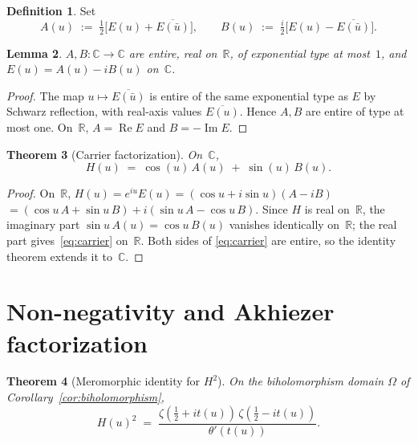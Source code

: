 \documentclass[11pt,a4paper]{article}
\newtheorem{theorem}{Theorem}[section]
\newtheorem{lemma}[theorem]{Lemma}
\theoremstyle{definition}
\newtheorem{definition}[theorem]{Definition}
\DeclareMathOperator{\Real}{Re}
\DeclareMathOperator{\Imag}{Im}
\newcommand{\C}{\mathbb{C}}
\newcommand{\R}{\mathbb{R}}
\begin{document}
\begin{definition}\label{def:AB}
Set
\begin{equation}
  A(u) \;:=\; \tfrac12\!\bigl[E(u) + \overline{E(\bar u)}\bigr],
  \qquad
  B(u) \;:=\; \tfrac{i}{2}\!\bigl[E(u) - \overline{E(\bar u)}\bigr].
\end{equation}
\end{definition}

\begin{lemma}\label{lem:AB}
$A,B\colon\C\to\C$ are entire, real on~$\R$, of exponential type at most~$1$, and
$E(u) = A(u) - iB(u)$ on~$\C$.
\end{lemma}

\begin{proof}
The map $u\mapsto\overline{E(\bar u)}$ is entire of the same exponential type as
$E$ by Schwarz reflection, with real-axis values $\overline{E(u)}$. Hence $A,B$ are
entire of type at most one. On~$\R$, $A=\Real E$ and $B=-\Imag E$.
\end{proof}

\begin{theorem}[Carrier factorization]\label{thm:carrier}
On~$\C$,
\begin{equation}
  H(u) \;=\; \cos(u)\,A(u) \;+\; \sin(u)\,B(u).
  \label{eq:carrier}
\end{equation}
\end{theorem}

\begin{proof}
On~$\R$, $H(u) = e^{iu}E(u) = (\cos u + i\sin u)(A-iB)$
$= (\cos u\,A + \sin u\,B) + i(\sin u\,A - \cos u\,B)$. Since $H$ is real on~$\R$,
the imaginary part $\sin u\,A(u) = \cos u\,B(u)$ vanishes identically on~$\R$;
the real part gives~\eqref{eq:carrier} on~$\R$. Both sides of \eqref{eq:carrier}
are entire, so the identity theorem extends it to~$\C$.
\end{proof}

\section{Non-negativity and Akhiezer factorization}
\label{sec:akhiezer}

\begin{theorem}[Meromorphic identity for $H^2$]\label{thm:meroid}
On the biholomorphism domain $\Omega$ of Corollary~\ref{cor:biholomorphism},
\begin{equation}
  H(u)^2 \;=\; \frac{\zeta(\tfrac12+it(u))\,\zeta(\tfrac12-it(u))}{\theta'(t(u))}.
  \label{eq:meroid}
\end{equation}
\end{theorem}
\end{document}
